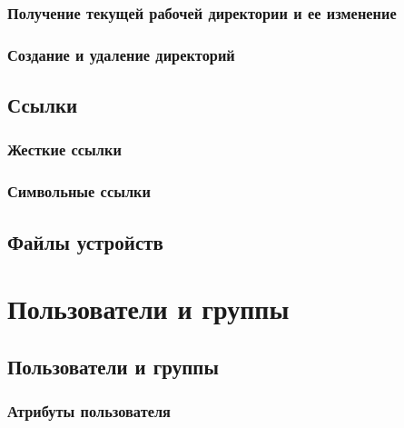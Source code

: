 \documentclass[oneside]{book}
\begin{document}
      \section{Получение текущей рабочей директории и ее изменение}
      	

      \section{Создание и удаление директорий}
      	


   \chapter{Ссылки}

      \section{Жесткие ссылки}
      

      \section{Символьные ссылки}
      

   \chapter{Файлы устройств}
   




\clearpage \part{Пользователи и группы}

   \chapter{Пользователи и группы}
   

      \section{Атрибуты пользователя}
      
\end{document}
